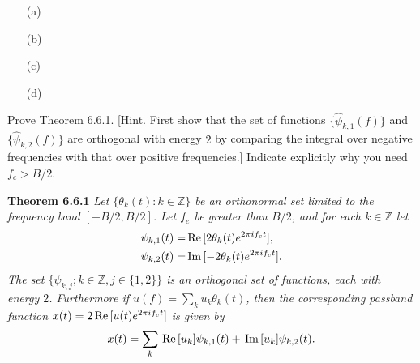 \documentclass{assignment}
\begin{document}
\begin{sol}
    \begin{itemize}
        \item[(a)] 
        \item[(b)] 
        \item[(c)] 
        \item[(d)] 
    \end{itemize}
\end{sol}

\begin{prob} Prove Theorem 6.6.1. [Hint. First show that the set of functions $\{\hat{\psi}_{k,1}(f)\}$ and $\{\hat{\psi}_{k,2}(f)\}$ are orthogonal with energy $2$ by comparing the integral over negative frequencies with that over positive frequencies.] Indicate explicitly why you need $f_c>B/2$.

    \begin{framed}
        \textbf{Theorem 6.6.1} \itshape Let $\{\theta_k(t):k\in\mathbb{Z}\}$ be an orthonormal set limited to the frequency band $[-B/2,B/2]$. Let $f_e$ be greater than $B/2$, and for each $k\in\mathbb{Z}$ let
        \begin{align*}
            \psi_{k,1}(t)=&\,\text{Re}\,[2\theta_k(t)e^{2\pi if_ct}],\\
            \psi_{k,2}(t)=&\,\text{Im}\,[-2\theta_k(t)e^{2\pi if_ct}].
        \end{align*}
        The set $\{\psi_{k,j};k\in\mathbb{Z},j\in\{1,2\}\}$ is an orthogonal set of functions, each with energy $2$. Furthermore if $u(f)=\sum_ku_k\theta_k(t)$, then the corresponding passband function $x(t)=2\,\text{Re}\,[u(t)e^{2\pi if_ct}]$ is given by
        \[
            x(t)=\sum_k\,\text{Re}\,[u_k]\psi_{k,1}(t)+\,\text{Im}\,[u_k]\psi_{k,2}(t).
        \]
    \end{framed}
\end{prob}
\begin{sol}
\end{sol}
\end{document}

